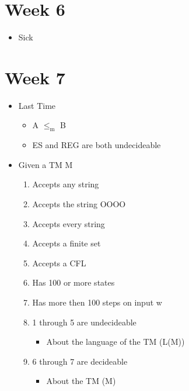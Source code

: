 \documentclass[11pt]{article}
\begin{document}
\section{Week 6}
\label{sec:org263a355}
\begin{itemize}
\item Sick
\end{itemize}
\section{Week 7}
\label{sec:org52a2af6}
\begin{itemize}
\item Last Time
\begin{itemize}
\item A \(\le_{\text{m}}\) B
\item ES and REG are both undecideable
\end{itemize}
\item Given a TM M
\begin{enumerate}
\item Accepts any string
\item Accepts the string OOOO
\item Accepts every string
\item Accepts a finite set
\item Accepts a CFL
\item Has 100 or more states
\item Has more then 100 steps on input w
\item 1 through 5 are undecideable
\begin{itemize}
\item About the language of the TM (L(M))
\end{itemize}
\item 6 through 7 are decideable
\begin{itemize}
\item About the TM (M)
\end{itemize}
\end{enumerate}
\end{itemize}
\end{document}

